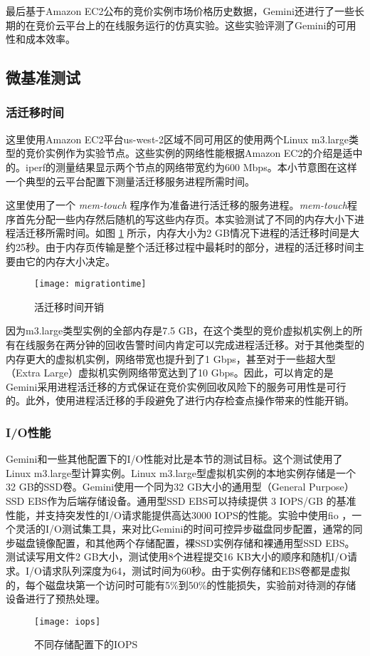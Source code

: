 最后基于Amazon EC2公布的竞价实例市场价格历史数据，Gemini还进行了一些长期的在竞价云平台上的在线服务运行的仿真实验。这些实验评测了Gemini的可用性和成本效率。

\subsection{微基准测试}

\subsubsection{活迁移时间}
这里使用Amazon EC2平台us-west-2区域不同可用区的使用两个Linux m3.large类型的竞价实例作为实验节点。这些实例的网络性能根据Amazon EC2的介绍是适中的。iperf\cite{Iperf:2014}的测量结果显示两个节点的网络带宽约为600 Mbps。本小节意图在这样一个典型的云平台配置下测量活迁移服务进程所需时间。

这里使用了一个 \emph{mem-touch} 程序作为准备进行活迁移的服务进程。\emph{mem-touch}程序首先分配一些内存然后随机的写这些内存页。本实验测试了不同的内存大小下进程活迁移所需时间。如图 \ref{figure:migrationtime} 所示，内存大小为2 GB情况下进程的活迁移时间是大约25秒。由于内存页传输是整个活迁移过程中最耗时的部分，进程的活迁移时间主要由它的内存大小决定。
\begin{figure}[]
  \centering
  \texttt{[image: migrationtime]}
  \caption{活迁移时间开销}
  \label{figure:migrationtime}
\end{figure}

因为m3.large类型实例的全部内存是7.5 GB，在这个类型的竞价虚拟机实例上的所有在线服务在两分钟的回收告警时间内肯定可以完成进程活迁移。对于其他类型的内存更大的虚拟机实例，网络带宽也提升到了1 Gbps，甚至对于一些超大型（Extra Large）虚拟机实例网络带宽达到了10 Gbps。因此，可以肯定的是Gemini采用进程活迁移的方式保证在竞价实例回收风险下的服务可用性是可行的。此外，使用进程活迁移的手段避免了进行内存检查点操作带来的性能开销。

\subsubsection{I/O性能}
Gemini和一些其他配置下的I/O性能对比是本节的测试目标。这个测试使用了Linux m3.large型计算实例。Linux m3.large型虚拟机实例的本地实例存储是一个32 GB的SSD卷。Gemini使用一个同为32 GB大小的通用型（General Purpose）SSD EBS作为后端存储设备。通用型SSD EBS可以持续提供 3 IOPS/GB 的基准性能，并支持突发性的I/O请求能提供高达3000 IOPS的性能。实验中使用fio \cite{FIO:2014}，一个灵活的I/O测试集工具，来对比Gemini的时间可控异步磁盘同步配置，通常的同步磁盘镜像配置，和其他两个存储配置，裸SSD实例存储和裸通用型SSD EBS。测试读写用文件2 GB大小，测试使用8个进程提交16 KB大小的顺序和随机I/O请求。I/O请求队列深度为64，测试时间为60秒。由于实例存储和EBS卷都是虚拟的，每个磁盘块第一个访问时可能有5\%到50\%的性能损失，实验前对待测的存储设备进行了预热处理。
\begin{figure}[]
  \centering
  \texttt{[image: iops]}
  \caption{不同存储配置下的IOPS}
  \label{figure:iops}
\end{figure}

